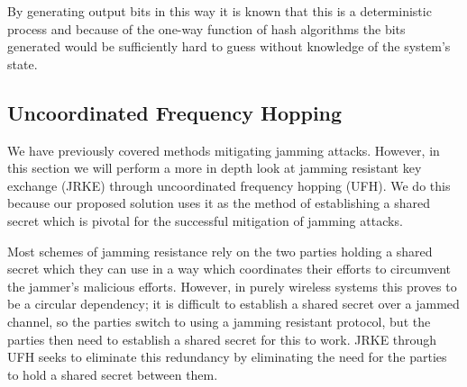 \documentclass[sigconf, anonymous]{acmart}
\begin{document}
By generating output bits in this way it is known that this is a deterministic process and because of the one-way function of hash algorithms the bits generated would be sufficiently hard to guess without knowledge of the system's state\cite{chang2006indifferentiable}. 


\subsection{Uncoordinated Frequency Hopping}

We have previously covered methods mitigating jamming attacks. However, in this section we will perform a more in depth look at jamming resistant key exchange (JRKE) through uncoordinated frequency hopping (UFH)\cite{strasser2008jamming}. We do this because our proposed solution uses it as the method of establishing a shared secret which is pivotal for the successful mitigation of jamming attacks. 

Most schemes of jamming resistance rely on the two parties holding a shared secret which they can use in a way which coordinates their efforts to circumvent the jammer's malicious efforts. However, in purely wireless systems this proves to be a circular dependency; it is difficult to establish a shared secret over a jammed channel, so the parties switch to using a jamming resistant protocol, but the parties then need to establish a shared secret for this to work. JRKE through UFH seeks to eliminate this redundancy by eliminating the need for the parties to hold a shared secret between them. 
\end{document}
